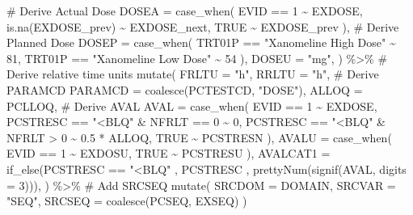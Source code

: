 \documentclass[
  letterpaper,
  DIV=11,
  numbers=noendperiod]{scrreprt}
\newenvironment{Shaded}{\begin{snugshade}}{\end{snugshade}}
\newcommand{\AttributeTok}[1]{\textcolor[rgb]{0.40,0.45,0.13}{#1}}
\newcommand{\CommentTok}[1]{\textcolor[rgb]{0.37,0.37,0.37}{#1}}
\newcommand{\ConstantTok}[1]{\textcolor[rgb]{0.56,0.35,0.01}{#1}}
\newcommand{\DecValTok}[1]{\textcolor[rgb]{0.68,0.00,0.00}{#1}}
\newcommand{\FloatTok}[1]{\textcolor[rgb]{0.68,0.00,0.00}{#1}}
\newcommand{\FunctionTok}[1]{\textcolor[rgb]{0.28,0.35,0.67}{#1}}
\newcommand{\NormalTok}[1]{\textcolor[rgb]{0.00,0.23,0.31}{#1}}
\newcommand{\SpecialCharTok}[1]{\textcolor[rgb]{0.37,0.37,0.37}{#1}}
\newcommand{\StringTok}[1]{\textcolor[rgb]{0.13,0.47,0.30}{#1}}
\begin{document}
\begin{Shaded}
\begin{Highlighting}[]
    \CommentTok{\# Derive Actual Dose}
    \AttributeTok{DOSEA =} \FunctionTok{case\_when}\NormalTok{(}
\NormalTok{      EVID }\SpecialCharTok{==} \DecValTok{1} \SpecialCharTok{\textasciitilde{}}\NormalTok{ EXDOSE,}
      \FunctionTok{is.na}\NormalTok{(EXDOSE\_prev) }\SpecialCharTok{\textasciitilde{}}\NormalTok{ EXDOSE\_next,}
      \ConstantTok{TRUE} \SpecialCharTok{\textasciitilde{}}\NormalTok{ EXDOSE\_prev}
\NormalTok{    ),}
    \CommentTok{\# Derive Planned Dose}
    \AttributeTok{DOSEP =} \FunctionTok{case\_when}\NormalTok{(}
\NormalTok{      TRT01P }\SpecialCharTok{==} \StringTok{"Xanomeline High Dose"} \SpecialCharTok{\textasciitilde{}} \DecValTok{81}\NormalTok{,}
\NormalTok{      TRT01P }\SpecialCharTok{==} \StringTok{"Xanomeline Low Dose"} \SpecialCharTok{\textasciitilde{}} \DecValTok{54}
\NormalTok{    ),}
    \AttributeTok{DOSEU =} \StringTok{"mg"}\NormalTok{,}
\NormalTok{  ) }\SpecialCharTok{\%\textgreater{}\%}
  \CommentTok{\# Derive relative time units}
  \FunctionTok{mutate}\NormalTok{(}
    \AttributeTok{FRLTU =} \StringTok{"h"}\NormalTok{,}
    \AttributeTok{RRLTU =} \StringTok{"h"}\NormalTok{,}
    \CommentTok{\# Derive PARAMCD}
    \AttributeTok{PARAMCD =} \FunctionTok{coalesce}\NormalTok{(PCTESTCD, }\StringTok{"DOSE"}\NormalTok{),}
    \AttributeTok{ALLOQ =}\NormalTok{ PCLLOQ,}
    \CommentTok{\# Derive AVAL}
    \AttributeTok{AVAL =} \FunctionTok{case\_when}\NormalTok{(}
\NormalTok{      EVID }\SpecialCharTok{==} \DecValTok{1} \SpecialCharTok{\textasciitilde{}}\NormalTok{ EXDOSE,}
\NormalTok{      PCSTRESC }\SpecialCharTok{==} \StringTok{"\textless{}BLQ"} \SpecialCharTok{\&}\NormalTok{ NFRLT }\SpecialCharTok{==} \DecValTok{0} \SpecialCharTok{\textasciitilde{}} \DecValTok{0}\NormalTok{,}
\NormalTok{      PCSTRESC }\SpecialCharTok{==} \StringTok{"\textless{}BLQ"} \SpecialCharTok{\&}\NormalTok{ NFRLT }\SpecialCharTok{\textgreater{}} \DecValTok{0} \SpecialCharTok{\textasciitilde{}} \FloatTok{0.5} \SpecialCharTok{*}\NormalTok{ ALLOQ,}
      \ConstantTok{TRUE} \SpecialCharTok{\textasciitilde{}}\NormalTok{ PCSTRESN}
\NormalTok{    ),}
    \AttributeTok{AVALU =} \FunctionTok{case\_when}\NormalTok{(}
\NormalTok{      EVID }\SpecialCharTok{==} \DecValTok{1} \SpecialCharTok{\textasciitilde{}}\NormalTok{ EXDOSU,}
      \ConstantTok{TRUE} \SpecialCharTok{\textasciitilde{}}\NormalTok{ PCSTRESU}
\NormalTok{    ),}
    \AttributeTok{AVALCAT1 =} \FunctionTok{if\_else}\NormalTok{(PCSTRESC }\SpecialCharTok{==} \StringTok{"\textless{}BLQ"}\NormalTok{ ,}
\NormalTok{                       PCSTRESC ,}
                       \FunctionTok{prettyNum}\NormalTok{(}\FunctionTok{signif}\NormalTok{(AVAL, }\AttributeTok{digits =} \DecValTok{3}\NormalTok{))),}
\NormalTok{  ) }\SpecialCharTok{\%\textgreater{}\%}
  \CommentTok{\# Add SRCSEQ}
  \FunctionTok{mutate}\NormalTok{(}
    \AttributeTok{SRCDOM =}\NormalTok{ DOMAIN,}
    \AttributeTok{SRCVAR =} \StringTok{"SEQ"}\NormalTok{,}
    \AttributeTok{SRCSEQ =} \FunctionTok{coalesce}\NormalTok{(PCSEQ, EXSEQ)}
\NormalTok{  )}


\end{Highlighting}
\end{Shaded}
\end{document}
